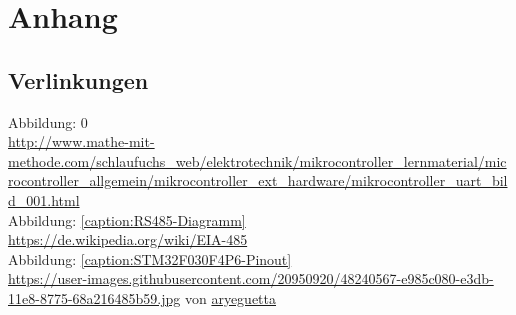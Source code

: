 \newpage
\section{Anhang}
\subsection{Verlinkungen}
    \begin{tcolorbox}[notitle,boxrule=0pt,colback=gray!20]
        Abbildung: 0\\
        \url{http://www.mathe-mit-methode.com/schlaufuchs_web/elektrotechnik/mikrocontroller_lernmaterial/microcontroller_allgemein/mikrocontroller_ext_hardware/mikrocontroller_uart_bild_001.html} \\
        
        Abbildung: \ref{caption:RS485-Diagramm} 
        \\\url{https://de.wikipedia.org/wiki/EIA-485}\\
        
        Abbildung: \ref{caption:STM32F030F4P6-Pinout}\\
        \href{https://user-images.githubusercontent.com/20950920/48240567-e985c080-e3db-11e8-8775-68a216485b59.jpg}{https://user-images.githubusercontent.com/20950920/48240567-e985c080-e3db-11e8-8775-68a216485b59.jpg}
        von \href{https://github.com/stm32duino/Arduino_Core_STM32/issues/165}{aryeguetta}\\

    \end{tcolorbox}
   
        